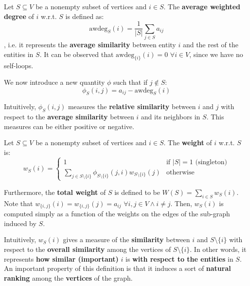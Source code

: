 Let $S\subseteq V$ be a nonempty subset of vertices and $i \in S$. The \textbf{average weighted degree} of $i$ w.r.t. $S$ is defined as:
\begin{equation}
  \text{awdeg}_S(i)=\frac{1}{|S|}\sum_{j\in S}a_{ij}
\end{equation}
, i.e. it represents the \textbf{average similarity} between entity $i$ and the rest of the entities in $S$. It can be observed that $\text{awdeg}_{\{i\}}(i) = 0$  $\forall i \in V$, since we have no self-loops.\\


We now introduce a new quantity $\phi$ such that if $j \notin S$:
\begin{equation}
  \phi_S(i, j)=a_{ij}-\text{awdeg}_S(i)
\end{equation}

Intuitively, $\phi_S(i, j)$ measures the \textbf{relative similarity} between $i$ and $j$ with respect to the \textbf{average similarity} between $i$ and its neighbors in $S$. This measures can be either positive or negative.

Let $S\subseteq V$ be a nonempty subset of vertices and $i \in S$. The \textbf{weight} of $i$ w.r.t. $S$ is:
\begin{equation}
  w_S(i)= \begin{cases}
      1 & \text{if } |S| = 1 \text{  (singleton)}\\
      \sum\limits_{j\in S\setminus \{i\}}\phi_{S\setminus \{i\}}(j, i)w_{S\setminus \{i\}}(j) & \text{otherwise}
  \end{cases}
\end{equation}

Furthermore, the \textbf{total weight} of $S$ is defined to be $W(S)=\sum_{i\in S}w_S(i)$.
Note that $w_{\{i, j\}}(i)=w_{\{i, j\}}(j)=a_{ij}$ $\forall i, j \in V \land i\neq j$. Then, $w_S(i)$ is computed simply as a function of the weights on the edges of the sub-graph induced by $S$.

Intuitively, $w_S(i)$ gives a measure of the \textbf{similarity} between $i$ and $S\setminus \{i\}$ with respect to the \textbf{overall similarity} among the vertices of $S\setminus \{i\}$. In other words, it represents \textbf{how similar (important)} $i$ is \textbf{with respect to the entities} in $S$. An important property of this definition is that it induces a sort of \textbf{natural ranking} among the \textbf{vertices} of the graph. 

